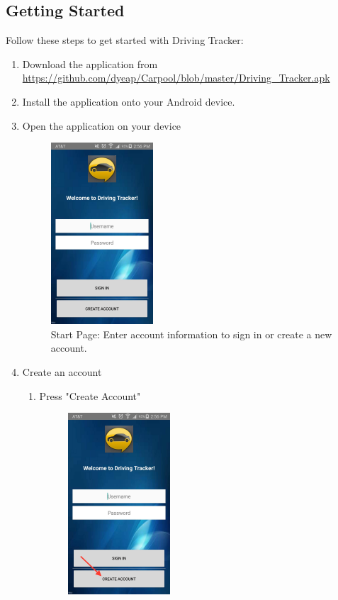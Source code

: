 \documentclass[12pt]{article}
\begin{document}
\subsection{Getting Started}
Follow these steps to get started with Driving Tracker: 
\begin{enumerate}
    \item Download the application from \url{https://github.com/dyeap/Carpool/blob/master/Driving_Tracker.apk}
    \item Install the application onto your Android device.
    \item Open the application on your device
        \begin{figure}[H]
            \centering
            \includegraphics[width=1.5in]{log_in.jpg} 
            \caption{Start Page: Enter account information to sign in or create a new account.}
            \label{log_in}
        \end{figure}
    \item Create an account
        \begin{enumerate}
            \item Press "Create Account"
                \begin{figure}[H]
                    \centering
                    \includegraphics[width=1.5in]{log_in-create_acc.jpg}

\end{figure}
\end{enumerate}
\end{enumerate}
\end{document}
